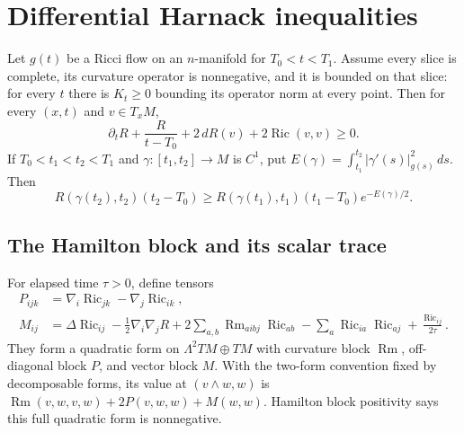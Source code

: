 \section{Differential Harnack inequalities}
\label{sec:rf-harnack}

\begin{theorem}\label{thm:rf-harnack}
Let $g(t)$ be a Ricci flow on an $n$-manifold for $T_0<t<T_1$.
Assume every slice is complete, its curvature operator is nonnegative,
and it is bounded on that slice: for every $t$ there is $K_t\geq0$
bounding its operator norm at every point.  Then for every $(x,t)$
and $v\in T_xM$,
\begin{equation}\label{eq:rf-harnack}
 \partial_tR+\frac{R}{t-T_0}+2\,dR(v)+2\operatorname{Ric}(v,v)\geq0.
\end{equation}
If $T_0<t_1<t_2<T_1$ and $\gamma:[t_1,t_2]\to M$ is $C^1$, put
$E(\gamma)=\int_{t_1}^{t_2}|\gamma'(s)|_{g(s)}^2\,ds$.  Then
\begin{equation}\label{eq:rf-harnack-path}
 R(\gamma(t_2),t_2)(t_2-T_0)\geq
 R(\gamma(t_1),t_1)(t_1-T_0)e^{-E(\gamma)/2}.
\end{equation}
\end{theorem}

\subsection{The Hamilton block and its scalar trace}

For elapsed time $\tau>0$, define tensors
\[
\begin{split}
 P_{ijk}&=\nabla_i\operatorname{Ric}_{jk}
                         -\nabla_j\operatorname{Ric}_{ik},\\
 M_{ij}&=\Delta\operatorname{Ric}_{ij}
       -\tfrac12\nabla_i\nabla_jR
       +2\sum_{a,b}\operatorname{Rm}_{aibj}\operatorname{Ric}_{ab}
       -\sum_a\operatorname{Ric}_{ia}\operatorname{Ric}_{aj}
       +\frac{\operatorname{Ric}_{ij}}{2\tau}.
\end{split}
\]
They form a quadratic form on $\Lambda^2 TM\oplus TM$ with curvature
block $\operatorname{Rm}$, off-diagonal block $P$, and vector block
$M$.  With the two-form convention fixed by decomposable forms, its
value at $(v\wedge w,w)$ is
$\operatorname{Rm}(v,w,v,w)+2P(v,w,w)+M(w,w)$.
Hamilton block positivity says this full quadratic form is nonnegative.

